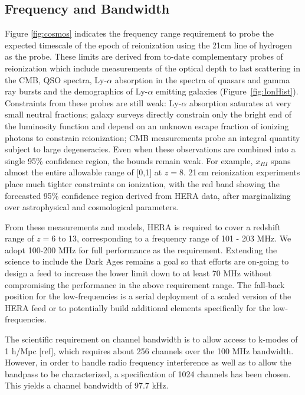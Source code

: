 \documentclass[preprint,11pt]{aastex}
\begin{document}
\subsection{Frequency and Bandwidth}
\label{sec:freqs}
Figure \ref{fig:cosmos} indicates the frequency range requirement to probe the expected timescale of the epoch of reionization using the 21cm line of hydrogen as the probe.  
These limits are derived from to-date complementary probes of reionization which include measurements of
the optical depth to last scattering in the CMB, QSO spectra, Ly-$\alpha$
absorption in the spectra of quasars and gamma ray bursts and the demographics
of Ly-$\alpha$ emitting galaxies
(Figure~\ref{fig:IonHist}). 
Constraints from these probes are still weak:
Ly-$\alpha$ absorption saturates at very small neutral fractions; galaxy
surveys directly constrain only the bright end of the luminosity function and
depend on an unknown escape fraction of ionizing photons to constrain
reionization; CMB measurements probe an integral quantity subject
to large degeneracies. Even when these observations are
combined into a single 95\% confidence region, the bounds remain weak.
For example, $x_{HI}$ spans almost the entire allowable range of [0,1]
at $z=8$. 21\,cm reionization experiments place much tighter constraints on ionization, with the
red band showing the forecasted 95\% confidence region derived from HERA data,
after marginalizing over astrophysical and cosmological parameters.

From these measurements and models, HERA is required to cover a redshift range of $z=$6 to 13, corresponding to a frequency range of 101 - 203 MHz.  We adopt 100-200 MHz for full performance as the requirement.  Extending the science to include the Dark Ages remains a goal so that efforts are on-going to design a feed to increase the lower limit down to at least 70 MHz without compromising the performance in the above requirement range.  The fall-back position for the low-frequencies is a serial deployment of a scaled version of the HERA feed or to potentially build additional elements specifically for the low-frequencies.  

The scientific requirement on channel bandwidth is to allow access to k-modes of 1 h/Mpc [ref], which requires about 256 channels over the 100 MHz bandwidth.  However, in order to handle radio frequency interference as well as to allow the bandpass to be characterized, a specification of 1024 channels has been chosen.  This yields a channel bandwidth of 97.7 kHz.
\end{document}
